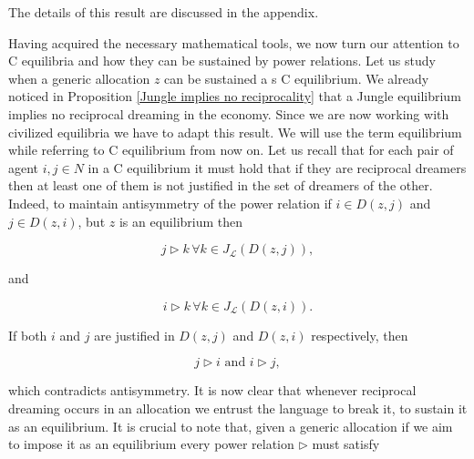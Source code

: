 The details of this result are discussed in the appendix.






Having acquired the necessary mathematical tools, we now turn our attention to C equilibria and how they can be sustained by power relations. Let us study when a generic allocation $z$ can be sustained a s C equilibrium. We already noticed in Proposition \ref{Jungle implies no reciprocality} that a Jungle equilibrium implies no reciprocal dreaming in the economy. Since we are now working with civilized equilibria we have to adapt this result. We will use the term equilibrium while referring to C equilibrium from now on. Let us recall that for each pair of agent $i,j\in N$ in a C equilibrium it must hold that if they are reciprocal dreamers then at least one of them is not justified in the set of dreamers of the other. Indeed, to maintain antisymmetry of the power relation if $i\in D(z,j)$ and $j\in D(z,i)$, but $z$ is an equilibrium then

\[j\triangleright k\,\forall k\in J_{\mathcal{L}}(D(z,j)),\]

and 

\[i\triangleright k\,\forall k\in J_{\mathcal{L}}(D(z,i)).\]

If both $i$ and $j$ are justified in $D(z,j)$ and $D(z,i)$ respectively, then

\[j\triangleright i \text{ and } i\triangleright j,\]

which contradicts antisymmetry. It is now clear that whenever reciprocal dreaming occurs in an allocation we entrust the language to break it, to sustain it as an equilibrium. It is crucial to note that, given a generic allocation if we aim to impose it as an equilibrium every power relation $\triangleright$ must satisfy

